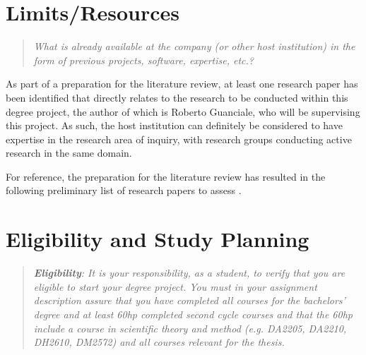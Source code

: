 \documentclass[12pt, a4paper]{article}
\begin{document}
\section{Limits/Resources}

\begin{quote}
	\textit{\textit{What is already available at the company (or other host institution) in the form of previous projects, software, expertise, etc.?}}
\end{quote}

As part of a preparation for the literature review, at least one research paper \cite{sound_transpilation_from_binary_to_ir} has been identified that directly relates to the research to be conducted within this degree project, the author of which is Roberto Guanciale, who will be supervising this project. As such, the host institution can definitely be considered to have expertise in the research area of inquiry, with research groups conducting active research in the same domain.

For reference, the preparation for the literature review has resulted in the following preliminary list of research papers to assess \cite{graph_based_ir,retargetable_binary_translator,dynamic_binary_translation,uqbt_binary_translator,retargetable_static_binary_translator,ssa_for_decompilation,valgrind,bitblaze,architecture_independent_binary_analysis_and_transformation,arm_analysis_using_llvm,bap,revgen,wartell_rewriting_x86_binaries,barf,singled_graph_disassembly,dbill,instruction_idiom_detection,graph_based_higher_order_ir,reconstruction_of_instruction_idioms,extracting_instruction_semantics_via_symbolic_exectuion_of_code_generators,software_transformation,state_of_the_art_of_war,function_recovery,bin2llvm,sound_transpilation_from_binary_to_ir,cast_study_llvm_suitable_for_binary_analysis,revng,evaluation_of_irs,binrec,lifter_synthesis,superset_disassembly,b2r2,llvm_ir_lifter_using_mcsema_and_dyninst,gtirb,case_for_bap_and_angr,retrowrite}.


\section{Eligibility and Study Planning}

\begin{quote}
	\textit{\textbf{Eligibility}: It is your responsibility, as a student, to verify that you are eligible to start your degree project. You must in your assignment description assure that you have completed all courses for the bachelors' degree and at least 60hp completed second cycle courses and that the 60hp include a course in scientific theory and method (e.g. DA2205, DA2210, DH2610, DM2572) and all courses relevant for the thesis.}
\end{quote}
\end{document}
